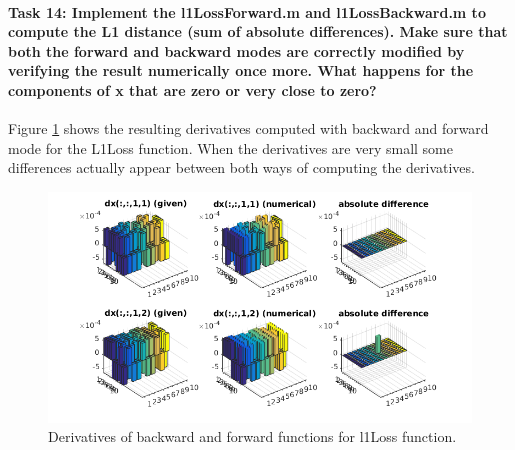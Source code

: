 \documentclass[12pt]{article}
\begin{document}
\paragraph{Task 14: Implement the l1LossForward.m and l1LossBackward.m to compute the L1 distance (sum of absolute differences). Make sure that both the forward and backward modes are correctly modified by verifying the result numerically once more. What happens for the components of x that are zero or very close to zero?} Figure \ref{fig:23b} shows the resulting derivatives computed with backward and forward mode for the L1Loss function. When the derivatives are very small some differences actually appear between both ways of computing the derivatives.
\begin{figure}[htbp]
 \centering
\includegraphics[width=\textwidth]{23bb}
\caption{Derivatives of backward and forward functions for l1Loss function.}
 \label{fig:23b}
\end{figure}
\end{document}
